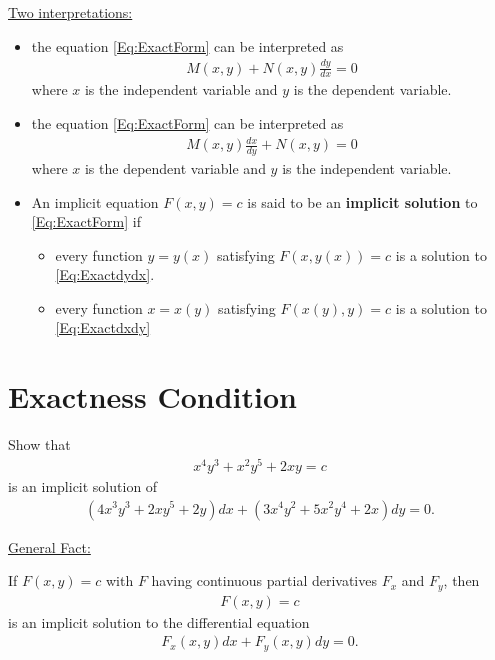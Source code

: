 \documentclass[12pt,a4paper]{article}
\newcounter{example}[section]
\begin{document}
\underline{Two interpretations:}
	\begin{itemize}
	\item the equation \eqref{Eq:ExactForm} can be interpreted as
		\begin{align}
		M(x, y) + N(x, y) \frac{dy}{dx} = 0 \label{Eq:Exactdydx}
		\end{align}
	where $x$ is the independent variable and $y$ is the dependent variable.
	\item the equation \eqref{Eq:ExactForm} can be interpreted as
		\begin{align}
		M (x, y) \frac{dx}{dy} + N(x, y) = 0 \label{Eq:Exactdxdy}
		\end{align}
	where $x$ is the dependent variable and $y$ is the independent variable.
	\item An implicit equation $F(x, y) = c$ is said to be an \textbf{implicit solution} to \eqref{Eq:ExactForm} if
		\begin{itemize}
		\item every function $y = y(x)$ satisfying $F(x, y(x)) = c$ is a solution to \eqref{Eq:Exactdydx}.
		\item every function $x = x(y)$ satisfying $F(x(y), y) = c$ is a solution to \eqref{Eq:Exactdxdy}
		\end{itemize}
	\end{itemize}
	
\newpage
	
	\section{Exactness Condition}
	
	\begin{example}
	Show that
		\begin{align*}
		x^4 y^3 + x^2 y^5 + 2xy = c
		\end{align*}
	is an implicit solution of
		\begin{align*}
		(4x^3 y^3 + 2xy^5 + 2y) dx + (3x^4y^2 + 5x^2 y^4 + 2x) dy = 0 .
		\end{align*}
	\end{example}
	
	\vfill
	
	\underline{General Fact:}
	
	If $F(x, y) = c$ with $F$ having continuous partial derivatives $F_x$ and $F_y$, then
		\begin{align*}
		F(x, y) = c
		\end{align*}
	is an implicit solution to the differential equation
		\begin{align*}
		F_x (x, y) dx + F_y (x, y) dy = 0 .
		\end{align*}
		
\end{document}
